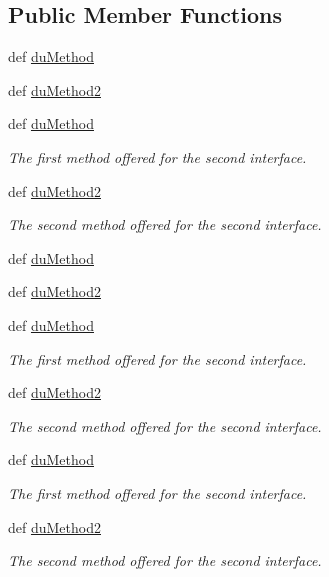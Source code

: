 \subsection*{Public Member Functions}
\begin{DoxyCompactItemize}
\item 
def \hyperlink{classdoxypypy_1_1test_1_1sample__interfaces_1_1_i_du_af769f1d57c88ce014536b3f50a0a8f36}{du\-Method}
\item 
def \hyperlink{classdoxypypy_1_1test_1_1sample__interfaces_1_1_i_du_a543ac211b117258c04d780824703401c}{du\-Method2}
\item 
def \hyperlink{classdoxypypy_1_1test_1_1sample__interfaces_1_1_i_du_af769f1d57c88ce014536b3f50a0a8f36}{du\-Method}
\begin{DoxyCompactList}\small\item\em The first method offered for the second interface. \end{DoxyCompactList}\item 
def \hyperlink{classdoxypypy_1_1test_1_1sample__interfaces_1_1_i_du_a543ac211b117258c04d780824703401c}{du\-Method2}
\begin{DoxyCompactList}\small\item\em The second method offered for the second interface. \end{DoxyCompactList}\item 
def \hyperlink{classdoxypypy_1_1test_1_1sample__interfaces_1_1_i_du_af769f1d57c88ce014536b3f50a0a8f36}{du\-Method}
\item 
def \hyperlink{classdoxypypy_1_1test_1_1sample__interfaces_1_1_i_du_a543ac211b117258c04d780824703401c}{du\-Method2}
\item 
def \hyperlink{classdoxypypy_1_1test_1_1sample__interfaces_1_1_i_du_af769f1d57c88ce014536b3f50a0a8f36}{du\-Method}
\begin{DoxyCompactList}\small\item\em The first method offered for the second interface. \end{DoxyCompactList}\item 
def \hyperlink{classdoxypypy_1_1test_1_1sample__interfaces_1_1_i_du_a543ac211b117258c04d780824703401c}{du\-Method2}
\begin{DoxyCompactList}\small\item\em The second method offered for the second interface. \end{DoxyCompactList}\item 
def \hyperlink{classdoxypypy_1_1test_1_1sample__interfaces_1_1_i_du_af769f1d57c88ce014536b3f50a0a8f36}{du\-Method}
\begin{DoxyCompactList}\small\item\em The first method offered for the second interface. \end{DoxyCompactList}\item 
def \hyperlink{classdoxypypy_1_1test_1_1sample__interfaces_1_1_i_du_a543ac211b117258c04d780824703401c}{du\-Method2}
\begin{DoxyCompactList}\small\item\em The second method offered for the second interface. \end{DoxyCompactList}\end{DoxyCompactItemize}


